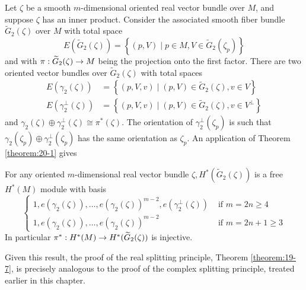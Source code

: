 Let $\zeta$ be a smooth $m$-dimensional oriented real vector bundle over $M$, and suppose $\zeta$ has an 
inner product. Consider the associated smooth fiber bundle $\widetilde{G}_{2}( \zeta )$ over $M$ with total space
\[
  E( {\widetilde{G}_{2}( \zeta ) })  = \left\{  {( {p,V})  \mid  p \in  M,V \in  \widetilde{G}_{2}( {\zeta }_{p}) }\right\}
\]
and with $\pi  : \widetilde{G}_{2}( \zeta )  \rightarrow  M$ being the projection onto the first factor. There are 
two oriented vector bundles over $\widetilde{G}_{2}( \zeta )$ with total spaces
\begin{align*}
  E( {{\gamma }_{2}( \zeta ) })  
    & = \left\{  {( {p,V,v})  \mid  ( {p,V})  \in  \widetilde{G}_{2}( \zeta ),v \in  V}\right\}\\
  E( {{\gamma }_{2}^{ \bot  }( \zeta ) })  
    & = \left\{  {( {p,V,v})  \mid  ( {p,V})  \in  \widetilde{G}_{2}( \zeta ),v \in  {V}^{ \bot  }}\right\}
\end{align*}
and ${\gamma }_{2}( \zeta )  \oplus  {\gamma }_{2}^{ \bot  }( \zeta )  \cong  {\pi }^*( \zeta )$. The orientation 
of ${\gamma }_{2}^{ \bot  }( {\zeta }_{p})$ is such that ${\gamma }_{2}( {\zeta }_{p})  \oplus  {\gamma }_{2}^{ \bot  }( {\zeta }_{p})$ 
has the same orientation as ${\zeta }_{p}$. An application of Theorem \ref{theorem:20-1} gives


\begin{theorem}\label{theorem:20-11}
  For any oriented $m$-dimensional real vector bundle $\zeta,H^*( {\widetilde{G}_{2}( \zeta ) })$ is 
  a free $H^*( M)$ module with basis
  \[
    \left\{  \begin{array}{ll} 1,e( {{\gamma }_{2}( \zeta ) }),\ldots,e{( {\gamma }_{2}( \zeta ) ) }^{m- 2},e( {{\gamma }_{2}^{ \bot  }( \zeta ) }) & \text{ if }m = {2n} \geq  4 \\  1,e( {{\gamma }_{2}( \zeta ) }),\ldots,e{( {\gamma }_{2}( \zeta ) ) }^{m- 2} & \text{ if }m = {2n} + 1 \geq  3 \end{array}\right.
  \]
  In particular ${\pi }^* : H^*( M)  \rightarrow  H^*( {\widetilde{G}_{2}( \zeta ) })$ is injective.
\end{theorem}

Given this result, the proof of the real splitting principle, Theorem \ref{theorem:19-7}, is precisely analogous to the 
proof of the complex splitting principle, treated earlier in this chapter.